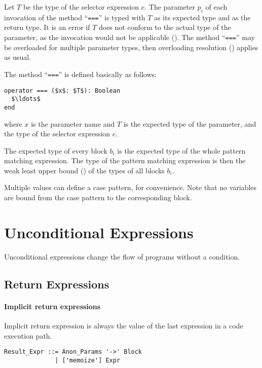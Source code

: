 Let $T$ be the type of the selector expression $e$. The parameter $p_i$ of each invocation of the method ``\lstinline!===!'' is typed with $T$ as its expected type and  as the return type. It is an error if $T$ does not conform to the actual type of the parameter, as the invocation would not be applicable (). The method ``\lstinline!===!'' may be overloaded for multiple parameter types, then overloading resolution () applies as usual. 

The method ``\lstinline!===!'' is defined basically as follows:
\begin{lstlisting}
operator === ($x$: $T$): Boolean
  $\ldots$
end
\end{lstlisting}
where $x$ is the parameter name and $T$ is the expected type of the parameter, and the type of the selector expression $e$. 

The expected type of every block $b_i$ is the expected type of the whole pattern matching expression. The type of the pattern matching expression is then the weak least upper bound () of the types of all blocks $b_i$.

Multiple values can define a case pattern, for convenience. Note that no variables are bound from the case pattern to the corresponding block.





\section{Unconditional Expressions}

Unconditional expressions change the flow of programs without a condition. 

\subsection{Return Expressions}
\label{sec:return-expressions}

\paragraph{Implicit return expressions}
Implicit return expression is always the value of the last expression in a code execution path. 

\syntax\begin{lstlisting}
Result_Expr ::= Anon_Params '->' Block 
              | ['memoize'] Expr
\end{lstlisting}

